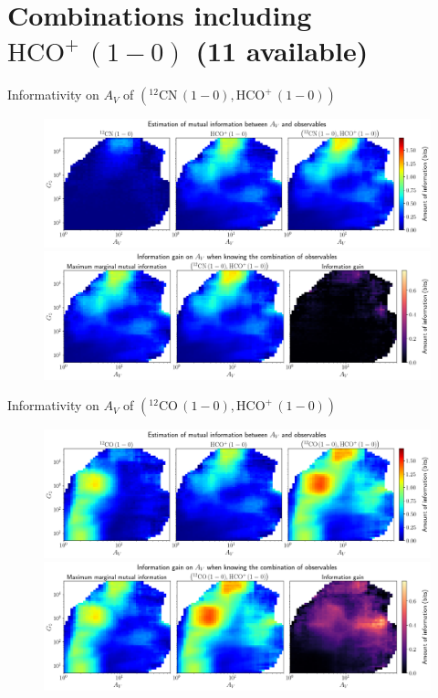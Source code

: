 \documentclass{beamer}
\begin{document}
\section{Combinations including $\mathrm{HCO^+\,(1-0)}$ (11 available)}

\begin{frame}{Informativity on $A_V$ of $\left(\mathrm{^{12}CN\,(1-0)},\mathrm{HCO^+\,(1-0)}\right)$}
    \begin{figure}
        \centering
        \includegraphics[width=0.95\linewidth]{../mi/av__12cn10_hcop10_mi.png}
        \vfill
        \includegraphics[width=0.95\linewidth]{../mi/av__12cn10_hcop10_mi_gain.png}
    \end{figure}
\end{frame}

\begin{frame}{Informativity on $A_V$ of $\left(\mathrm{^{12}CO\,(1-0)},\mathrm{HCO^+\,(1-0)}\right)$}
    \begin{figure}
        \centering
        \includegraphics[width=0.95\linewidth]{../mi/av__12co10_hcop10_mi.png}
        \vfill
        \includegraphics[width=0.95\linewidth]{../mi/av__12co10_hcop10_mi_gain.png}
    \end{figure}
\end{frame}
\end{document}
